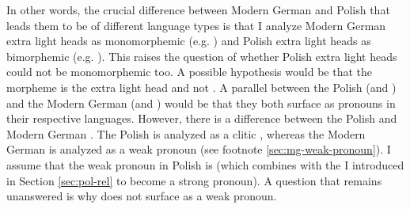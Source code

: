 In other words, the crucial difference between Modern German and Polish that leads them to be of different language types is that I analyze Modern German extra light heads as monomorphemic (e.g. ) and Polish extra light heads as bimorphemic (e.g. ).
This raises the question of whether Polish extra light heads could not be monomorphemic too. A possible hypothesis would be that the morpheme  is the extra light head and not .
A parallel between the Polish  (and ) and the Modern German  (and ) would be that they both surface as pronouns in their respective languages. However, there is a difference between the Polish  and Modern German . The Polish  is analyzed as a clitic \cite{swan2002}, whereas the Modern German  is analyzed as a weak pronoun (see footnote \ref{sec:mg-weak-pronoun}).
I assume that the weak pronoun in Polish is  (which combines with the  I introduced in Section \ref{sec:pol-rel} to become a strong pronoun). A question that remains unanswered is why  does not surface as a weak pronoun.

